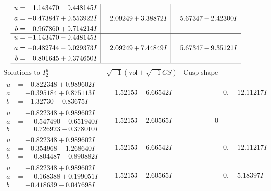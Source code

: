 \documentclass[1p]{elsarticle_modified}
\theoremstyle{definition}
\newcommand{\I}{\sqrt{-1}}
\begin{document}
$$\begin{array}{c|c|c}
\begin{aligned}
u &= -1.143470 - 0.448145 I \\
a &= -0.473847 + 0.553922 I \\
b &= -0.967860 + 0.714214 I\end{aligned}
 & \phantom{-}2.09249 + 3.38872 I & \phantom{-}5.67347 - 2.42300 I \\ \hline\begin{aligned}
u &= -1.143470 - 0.448145 I \\
a &= -0.482744 - 0.029373 I \\
b &= \phantom{-}0.801645 + 0.374650 I\end{aligned}
 & \phantom{-}2.09249 + 7.44849 I & \phantom{-}5.67347 - 9.35121 I\\
 \hline 
 \end{array}$$\newpage$$\begin{array}{c|c|c}  
\text{Solutions to }I^u_{2}& \I (\text{vol} + \sqrt{-1}CS) & \text{Cusp shape}\\
 \hline 
\begin{aligned}
u &= -0.822348 + 0.989602 I \\
a &= -0.395184 + 0.875113 I \\
b &= -1.32730 + 0.83675 I\end{aligned}
 & \phantom{-}1.52153 - 6.66542 I & \phantom{-0.000000 -}0. + 12.11217 I \\ \hline\begin{aligned}
u &= -0.822348 + 0.989602 I \\
a &= \phantom{-}0.547490 - 0.651940 I \\
b &= \phantom{-}0.726923 - 0.378010 I\end{aligned}
 & \phantom{-}1.52153 - 2.60565 I & \phantom{-0.000000 } 0 \\ \hline\begin{aligned}
u &= -0.822348 + 0.989602 I \\
a &= -0.354968 - 1.268640 I \\
b &= \phantom{-}0.804487 - 0.890882 I\end{aligned}
 & \phantom{-}1.52153 - 6.66542 I & \phantom{-0.000000 -}0. + 12.11217 I \\ \hline\begin{aligned}
u &= -0.822348 + 0.989602 I \\
a &= \phantom{-}0.168388 + 0.199051 I \\
b &= -0.418639 - 0.047698 I\end{aligned}
 & \phantom{-}1.52153 - 2.60565 I & \phantom{-0.000000 -}0. + 5.18397 I \\ \hline\begin{aligned}

\end{aligned}
\end{array}$$
\end{document}
